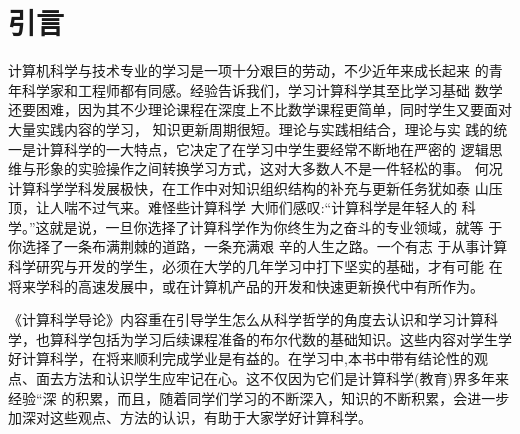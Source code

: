 \documentclass{article}
\begin{document}
\section{引言}
  计算机科学与技术专业的学习是一项十分艰巨的劳动，不少近年来成长起来 的青年科学家和工程师都有同感。经验告诉我们，学习计算科学其至比学习基础 数学还要困难，因为其不少理论课程在深度上不比数学课程更简单，同时学生又要面对大量实践内容的学习， 知识更新周期很短。理论与实践相结合，理论与实 践的统一是计算科学的一大特点，它决定了在学习中学生要经常不断地在严密的 逻辑思维与形象的实验操作之间转换学习方式，这对大多数人不是一件轻松的事。 何况计算科学学科发展极快，在工作中对知识组织结构的补充与更新任务犹如泰 山压顶，让人喘不过气来。难怪些计算科学 大师们感叹:“计算科学是年轻人的 科学。”这就是说，一旦你选择了计算科学作为你终生为之奋斗的专业领域，就等 于你选择了一条布满荆棘的道路，一条充满艰 辛的人生之路。一个有志 于从事计算科学研究与开发的学生，必须在大学的几年学习中打下坚实的基础，才有可能 在将来学科的高速发展中，或在计算机产品的开发和快速更新换代中有所作为。\par
 《计算科学导论》内容重在引导学生怎么从科学哲学的角度去认识和学习计算科学，也算科学包括为学习后续课程准备的布尔代数的基础知识。这些内容对学生学好计算科学，在将来顺利完成学业是有益的。在学习中,本书中带有结论性的观点、面去方法和认识学生应牢记在心。这不仅因为它们是计算科学(教育)界多年来经验“深 的积累，而且，随着同学们学习的不断深入，知识的不断积累，会进一步加深对这些观点、方法的认识，有助于大家学好计算科学。
\end{document}
